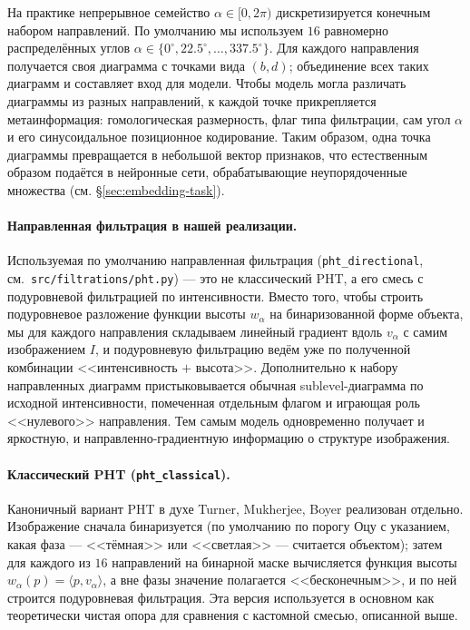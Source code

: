 На практике непрерывное семейство $\alpha \in [0, 2\pi)$ дискретизируется конечным набором направлений. По умолчанию мы используем $16$ равномерно распределённых углов $\alpha \in \{0^\circ, 22{.}5^\circ, \dots, 337{.}5^\circ\}$. Для каждого направления получается своя диаграмма с точками вида $(b, d)$; объединение всех таких диаграмм и составляет вход для модели. Чтобы модель могла различать диаграммы из разных направлений, к каждой точке прикрепляется метаинформация: гомологическая размерность, флаг типа фильтрации, сам угол $\alpha$ и его синусоидальное позиционное кодирование. Таким образом, одна точка диаграммы превращается в небольшой вектор признаков, что естественным образом подаётся в нейронные сети, обрабатывающие неупорядоченные множества (см. §\ref{sec:embedding-task}).

\paragraph{Направленная фильтрация в нашей реализации.}
Используемая по умолчанию направленная фильтрация (\texttt{pht\_directional}, см.\ \texttt{src/filtrations/pht.py}) --- это не классический PHT, а его смесь с подуровневой фильтрацией по интенсивности. Вместо того, чтобы строить подуровневое разложение функции высоты $w_\alpha$ на бинаризованной форме объекта, мы для каждого направления складываем линейный градиент вдоль $v_\alpha$ с самим изображением $I$, и подуровневую фильтрацию ведём уже по полученной комбинации <<интенсивность $+$ высота>>. Дополнительно к набору направленных диаграмм пристыковывается обычная sublevel-диаграмма по исходной интенсивности, помеченная отдельным флагом и играющая роль <<нулевого>> направления. Тем самым модель одновременно получает и яркостную, и направленно-градиентную информацию о структуре изображения.

\paragraph{Классический PHT (\texttt{pht\_classical}).}
Каноничный вариант PHT в духе Turner, Mukherjee, Boyer реализован отдельно. Изображение сначала бинаризуется (по умолчанию по порогу Оцу с указанием, какая фаза --- <<тёмная>> или <<светлая>> --- считается объектом); затем для каждого из $16$ направлений на бинарной маске вычисляется функция высоты $w_\alpha(p) = \langle p, v_\alpha\rangle$, а вне фазы значение полагается <<бесконечным>>, и по ней строится подуровневая фильтрация. Эта версия используется в основном как теоретически чистая опора для сравнения с кастомной смесью, описанной выше.

